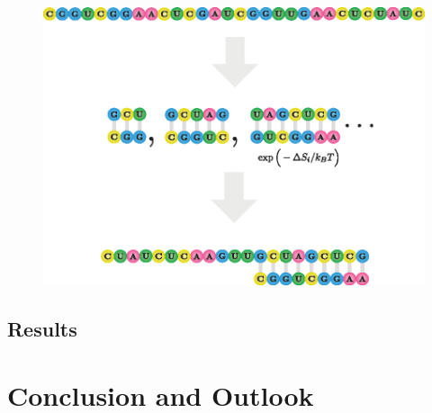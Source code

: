 \documentclass[11pt]{article}
\begin{document}
\begin{figure}[H]
\centering
\includegraphics{fig/rna_gillespie_algo}
\end{figure}
\lipsum[2]
\subsection{Results}
\lipsum[2]
\section{Conclusion and Outlook}
\lipsum[2-4]
\lipsum[2-4]
\newpage
\nocite{*}
\printbibliography
\end{document}
